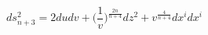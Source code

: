 \begin{equation}
\label{penrosekaigo} 
ds^2_{n+3}=2dudv+\big(\frac{1}{v}\big)^{\frac{2n}{n+4}}dz^2+v^{\frac{4}{n+4}}dx^idx^i
\end{equation}

